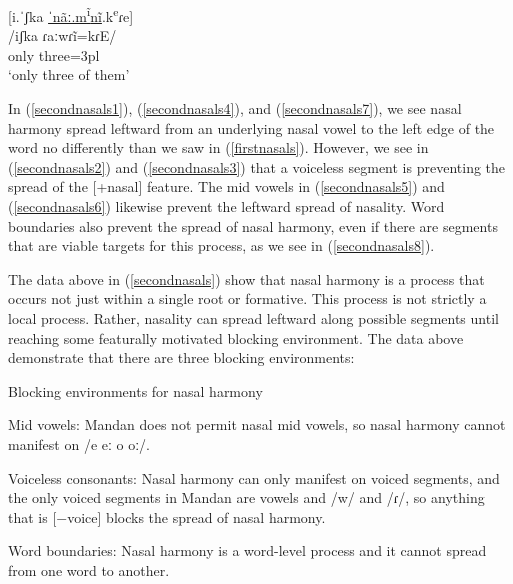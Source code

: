 \begin{exe}
\begin{xlist}
	\item\label{secondnasals8}
	\glll \textnormal{[i.ˈʃka} \textnormal{\uline{ˈnãː.m\textsuperscript{ĩ}nĩ}.k\textsuperscript{e}ɾe]}\\
	/iʃka ɾaːwɾĩ=kɾE/\\
	\textnormal{only} \textnormal{three}=3pl\\
	\glt `only three of them' \citep[168]{trechter2012b}

	\end{xlist}
\end{exe}

In (\ref{secondnasals1}), (\ref{secondnasals4}), and (\ref{secondnasals7}), we see nasal harmony spread leftward from an underlying nasal vowel to the left edge of the word no differently than we saw in (\ref{firstnasals}). However, we see in (\ref{secondnasals2}) and (\ref{secondnasals3}) that a voiceless segment is preventing the spread of the [+nasal] feature. The mid vowels in (\ref{secondnasals5}) and (\ref{secondnasals6}) likewise prevent the leftward spread of nasality. Word boundaries also prevent the spread of nasal harmony, even if there are segments that are viable targets for this process, as we see in (\ref{secondnasals8}).

The data above in (\ref{secondnasals}) show that nasal harmony is a process that occurs not just within a single root or formative. This process is not strictly a local process. Rather, nasality can spread leftward along possible segments until reaching some featurally motivated blocking environment. The data above demonstrate that there are three blocking environments:

\begin{exe}

\item\label{ThreeBlockingEnvironments} Blocking environments for nasal harmony

	\begin{xlist}

	\item Mid vowels: Mandan does not permit nasal mid vowels, so nasal harmony cannot manifest on /e eː o oː/.

	\item Voiceless consonants: Nasal harmony can only manifest on voiced segments, and the only voiced segments in Mandan are vowels and /w/ and /ɾ/, so anything that is [$-$voice] blocks the spread of nasal harmony.

	\item Word boundaries: Nasal harmony is a word-level process and it cannot spread from one word to another.

	\end{xlist}

\end{exe}

